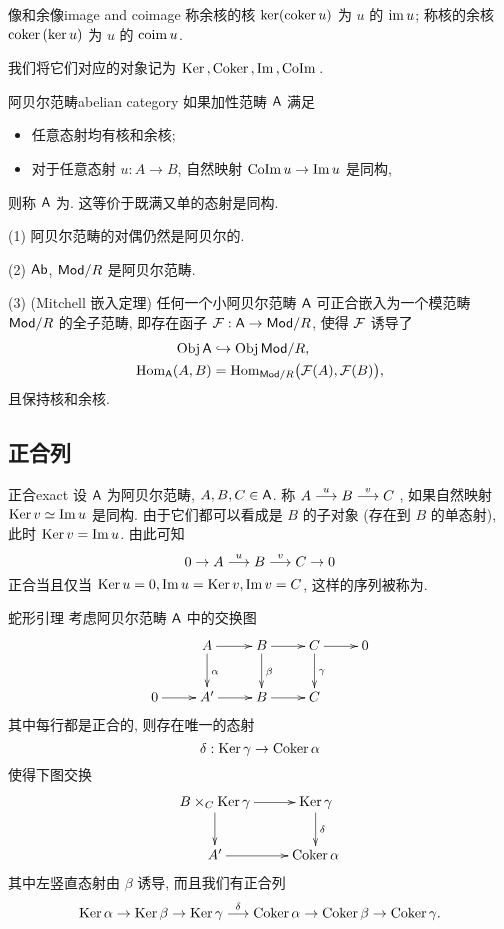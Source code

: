 \begin{definition}{像和余像}{image and coimage}
称余核的核 $\ker({\mathrm{coker}\,} u)$ 为 $u$ 的 ${\mathrm{im}\,} u$;
称核的余核 ${\mathrm{coker}\,}(\ker u)$ 为 $u$ 的 ${\mathrm{coim}\,} u$.
\end{definition}

我们将它们对应的对象记为 ${\mathrm{Ker}\,},{\mathrm{Coker}\,},{\mathrm{Im}\,},{\mathrm{CoIm}\,}$.

\begin{definition}{阿贝尔范畴}{abelian category}
如果加性范畴 ${\mathsf{A}}$ 满足
\begin{itemize}
\item 任意态射均有核和余核;
\item 对于任意态射 $u:A\to B$, 自然映射 ${\mathrm{CoIm}\,} u\to {\mathrm{Im}\,} u$ 是同构,
\end{itemize}
则称 ${\mathsf{A}}$ 为. 这等价于既满又单的态射是同构.
\end{definition}

\begin{example}
(1) 阿贝尔范畴的对偶仍然是阿贝尔的.

(2) ${\mathsf{Ab}}$, ${\mathsf{Mod}}/R$ 是阿贝尔范畴.

(3) (Mitchell 嵌入定理) 任何一个小阿贝尔范畴 ${\mathsf{A}}$ 可正合嵌入为一个模范畴 ${\mathsf{Mod}}/R$ 的全子范畴, 即存在函子 ${\mathcal{F}}:{\mathsf{A}}\to {\mathsf{Mod}}/R$, 使得 ${\mathcal{F}}$ 诱导了
\begin{align*}
{\mathrm{Obj}\,} {\mathsf{A}}&\hookrightarrow {\mathrm{Obj}\,}{\mathsf{Mod}}/R,\\
{\mathrm{Hom}}_{\mathsf{A}}(A,B)&={\mathrm{Hom}}_{{\mathsf{Mod}}/R}\bigl({\mathcal{F}}(A),{\mathcal{F}}(B)\bigr),
\end{align*}
且保持核和余核.
\end{example}



\subsection{正合列}\label{subsec:exact_sequence}

\begin{definition}{正合}{exact}
设 ${\mathsf{A}}$ 为阿贝尔范畴, $A,B,C\in {\mathsf{A}}$. 称 $A\stackrel{u}{\longrightarrow} B\stackrel{v}{\longrightarrow} C$ , 如果自然映射 ${\mathrm{Ker}\,} v\simeq {\mathrm{Im}\,} u$ 是同构. 由于它们都可以看成是 $B$ 的子对象 (存在到 $B$ 的单态射), 此时 ${\mathrm{Ker}\,} v={\mathrm{Im}\,} u$.
由此可知
  \[0\rightarrow A \stackrel{u}{\longrightarrow}B\stackrel{v}{\longrightarrow}C\rightarrow 0\]
正合当且仅当 ${\mathrm{Ker}\,} u=0, {\mathrm{Im}\,} u={\mathrm{Ker}\,} v,{\mathrm{Im}\,} v=C$, 这样的序列被称为.
\end{definition}

\begin{proposition}{蛇形引理}{}
考虑阿贝尔范畴 ${\mathsf{A}}$ 中的交换图
  \[\xymatrix{
    &A\ar[r]\ar[d]^{\alpha}&B\ar[r]\ar[d]^\beta&C\ar[r]\ar[d]^\gamma&0\\
    0\ar[r]&A'\ar[r]&B\ar[r]&C
  }\]
其中每行都是正合的, 则存在唯一的态射
  \[\delta:{\mathrm{Ker}\,} \gamma\to {\mathrm{Coker}\,}\alpha\]
使得下图交换
  \[\xymatrix{
    B\times_C\Ker\gamma\ar[r]\ar[d]&\Ker \gamma\ar[d]^\delta\\
    A'\ar[r]&\Coker \alpha
  }\]
其中左竖直态射由 $\beta$ 诱导, 而且我们有正合列
  \[{\mathrm{Ker}\,}\alpha\to{\mathrm{Ker}\,}\beta\to{\mathrm{Ker}\,}\gamma\stackrel{\delta}{\longrightarrow}{\mathrm{Coker}\,}\alpha\to{\mathrm{Coker}\,}\beta\to{\mathrm{Coker}\,}\gamma.\]
\end{proposition}

